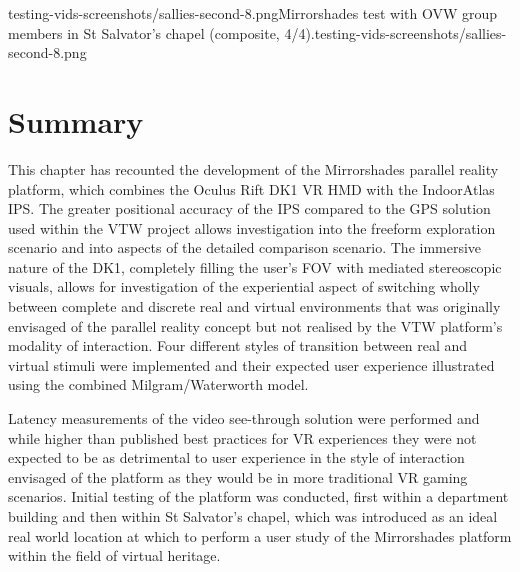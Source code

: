 
       {testing-vids-screenshots/sallies-second-8.png}{Mirrorshades test with OVW group members in St Salvator's chapel (composite, 4/4).}{testing-vids-screenshots/sallies-second-8.png}


\section{Summary}
This chapter has recounted the development of the Mirrorshades parallel reality platform, which combines the Oculus Rift DK1 VR HMD with the IndoorAtlas IPS. The greater positional accuracy of the IPS compared to the GPS solution used within the VTW project allows investigation into the freeform exploration scenario and into aspects of the detailed comparison scenario. The immersive nature of the DK1, completely filling the user's FOV with mediated stereoscopic visuals, allows for investigation of the experiential aspect of switching wholly between complete and discrete real and virtual environments that was originally envisaged of the parallel reality concept but not realised by the VTW platform's modality of interaction. Four different styles of transition between real and virtual stimuli were implemented and their expected user experience illustrated using the combined Milgram/Waterworth model.

Latency measurements of the video see-through solution were performed and while higher than published best practices for VR experiences they were not expected to be as detrimental to user experience in the style of interaction envisaged of the platform as they would be in more traditional VR gaming scenarios. Initial testing of the platform was conducted, first within a department building and then within St Salvator's chapel, which was introduced as an ideal real world location at which to perform a user study of the Mirrorshades platform within the field of virtual heritage.

